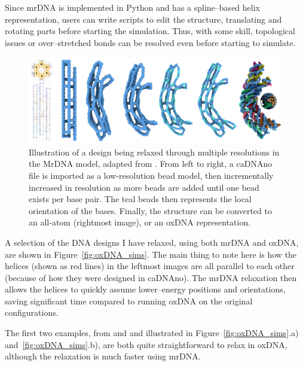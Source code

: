 Since mrDNA is implemented in Python and has a spline--based helix representation, users can write scripts to edit the structure, translating and rotating parts before starting the simulation. Thus, with some skill, topological issues or over--stretched bonds can be resolved even before starting to simulate.

\begin{figure}[ht]
  \begin{center}
    \includegraphics[width=\textwidth]{figures/mrDNA.jpg}
    \caption{Illustration of a design being relaxed through multiple resolutions in the MrDNA model, adapted from \cite{maffeo2019mrdna}. From left to right, a caDNAno file is imported as a low-resolution bead model, then incrementally increased in resolution as more beads are added until one bead exists per base pair. The teal beads then represents the local orientation of the bases. Finally, the structure can be converted to an all-atom (rightmost image), or an oxDNA representation.}
    \label{fig:mrdna}
  \end{center}
\end{figure}


A selection of the DNA designs I have relaxed, using both mrDNA and oxDNA, are shown in Figure~\ref{fig:oxDNA_sims}. The main thing to note here is how the helices (shown as red lines) in the leftmost images are all parallel to each other (because of how they were designed in caDNAno). The mrDNA relaxation then allows the helices to quickly assume lower--energy positions and orientations, saving significant time compared to running oxDNA on the original configurations.

The first two examples, from \cite{gerling2015dynamic} and \cite{zadegan2012smallbox} and illustrated in Figure~\ref{fig:oxDNA_sims}.a) and~\ref{fig:oxDNA_sims}.b), are both quite straightforward to relax in oxDNA, although the relaxation is much faster using mrDNA.


